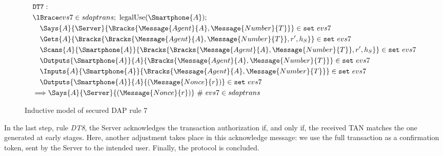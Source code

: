 \begin{figure}[!h]
  \begin{align*}
    & \texttt{DT7}: \newline \\
    & \lBrace evs7 \in sdaptrans;\ \text{legalUse}(\Smartphone{A}); \\
    & \quad \Says{A}{\Server}{\Bracks{\Message{Agent}{A}, \Message{Number}{T}}} \in \texttt{set} \ evs7 \\
    & \quad \Gets{A}{\Bracks{\Bracks{\Message{Agent}{A}, \Message{Number}{T}}, r', h_S}} \in \texttt{set} \ evs7 \\
    & \quad \Scans{A}{\Smartphone{A}}{\Bracks{\Bracks{\Message{Agent}{A}, \Message{Number}{T}}, r', h_S}} \in \texttt{set} \ evs7 \\
    & \quad \Outputs{\Smartphone{A}}{A}{\Bracks{\Message{Agent}{A}, \Message{Number}{T}}} \in \texttt{set} \ evs7 \\
    & \quad \Inputs{A}{\Smartphone{A}}{\Bracks{\Message{Agent}{A}, \Message{Number}{T}}} \in \texttt{set} \ evs7 \\
    & \quad \Outputs{\Smartphone{A}}{A}{(\Message{Nonce}{r})} \in \texttt{set} \ evs7 \\
    & \Longrightarrow \Says{A}{\Server}{(\Message{Nonce}{r})} \ \# \ evs7 \in sdaptrans
  \end{align*}
  \label{fig:dap-model-7}
  \caption{Inductive model of secured DAP rule 7}
\end{figure}

In the last step, rule \textit{DT8}, the Server acknowledges the transaction authorization if, and only if, the received TAN matches the one generated at early stages. Here, another adjustment takes place in this acknowledge message: we use the full transaction as a confirmation token, sent by the Server to the intended user. Finally, the protocol is concluded.

